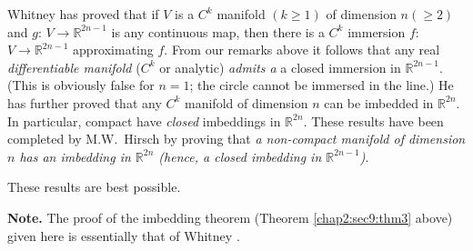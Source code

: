 Whitney \cite{49} has proved that if $V$ is a $C^k$ manifold $(k \geq 1)$
of dimension $n (\geq 2)$ and $g$: $V \to \mathbb{R}^{2n-1}$ is any
continuous map, then there is a $C^k$ immersion $f$: $V \to
\mathbb{R}^{2n-1}$ approximating $f$. From our remarks above it
follows that any real \textit{differentiable manifold} ($C^k$ or
analytic) \textit{admits a} a closed immersion in $
\mathbb{R}^{2n-1}$. (This is obviously false for $n=1$; the circle
cannot be immersed in the line.) He has further proved \cite{48} that any
$C^k$ manifold of dimension $n$ can be imbedded in $
\mathbb{R}^{2n}$. In particular, compact have \textit{closed}
imbeddings in $\mathbb{R}^{2n}$. These results have been completed by
M.W.~Hirsch \cite{15} by proving that \textit{a non-compact manifold of
  dimension $n$ has an imbedding in $ \mathbb{R}^{2n}$ (hence, a
  closed imbedding in $\mathbb{R}^{2n-1}$)}.  

These results are best possible.

\medskip
\noindent
{\bf Note.} The proof of the imbedding theorem (Theorem \ref{chap2:sec9:thm3} above) given
here is essentially that of Whitney \cite{50}. 
